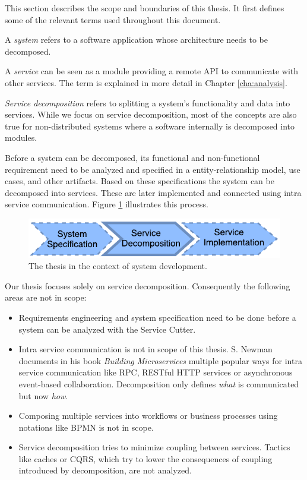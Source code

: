 This section describes the scope and boundaries of this thesis. It first defines some of the relevant terms used throughout this document.

A \textit{system} refers to a software application whose architecture needs to be decomposed.

A \textit{service} can be seen as a module providing a remote \gls{API} to communicate with other services. The term is explained in more detail in Chapter \ref{cha:analysis}.

\textit{Service decomposition} refers to splitting a system's functionality and data into services. While we focus on service decomposition, most of the concepts are also true for non-distributed systems where a software internally is decomposed into modules. 

Before a system can be decomposed, its functional and non-functional requirement need to be analyzed and specified in a entity-relationship model, use cases, and other artifacts. Based on these specifications the system can be decomposed into services. These are later implemented and connected using intra service communication. Figure \ref{fig:context} illustrates this process.

\begin{figure}[H]
	\begin{center}
		\includegraphics[scale=1.4]{diagrams/context.pdf}
	\end{center}
	\caption{The thesis in the context of system development.}
	\label{fig:context}
\end{figure}

Our thesis focuses solely on service decomposition. Consequently the following areas are not in scope:

\begin{itemize}
	\item Requirements engineering and system specification need to be done before a system can be analyzed with the Service Cutter.
	\item Intra service communication is not in scope of this thesis. S. Newman documents in his book \textit{Building Microservices}\cite{newman2015building} multiple popular ways for intra service communication like \gls{RPC}, RESTful HTTP services or asynchronous event-based collaboration. Decomposition only defines \textit{what} is communicated but now \textit{how}. 
	\item Composing multiple services into workflows or business processes using notations like \gls{BPMN} is not in scope.
	\item Service decomposition tries to minimize coupling between services. Tactics like caches or \gls{CQRS}, which try to lower the consequences of coupling introduced by decomposition, are not analyzed. 
\end{itemize}


